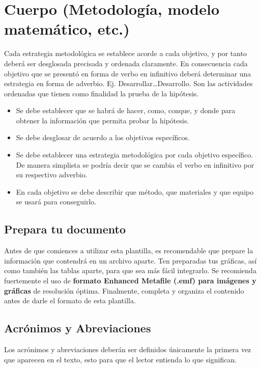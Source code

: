     \section{Cuerpo (Metodología, modelo matemático, etc.)}
    
    Cada estrategia metodológica se establece acorde a cada objetivo, y por tanto deberá ser desglosada precisada y ordenada claramente. En consecuencia cada objetivo que se presentó en forma de verbo en infinitivo deberá determinar una estrategia en forma de adverbio. Ej. Desarrollar…Desarrollo. Son las actividades ordenadas que tienen como finalidad la prueba de la hipótesis. 
    
    \begin{itemize}
        \item Se debe establecer que se habrá de hacer, como, conque, y donde para obtener la información que permita probar la hipótesis.  
        \item Se debe desglosar de acuerdo a los objetivos específicos. 
        \item Se debe establecer una estrategia metodológica por cada objetivo específico. De manera simplista se podría decir que se cambia el verbo en infinitivo por su respectivo adverbio.
        \item En cada objetivo se debe describir que método, que materiales y que equipo se usará para conseguirlo.
    \end{itemize}
    \subsection{Prepara tu documento}
    
    Antes de que comiences a utilizar esta plantilla, es recomendable que prepare la información que contendrá en un archivo aparte. 
    Ten preparadas tus gráficas, así como también las tablas aparte, para que sea más fácil integrarlo. 
    Se recomienda fuertemente el uso de \textbf{formato Enhanced Metafile (.emf) para imágenes y gráficas} de resolución óptima. 
    Finalmente, completa y organiza el contenido antes de darle el formato de esta plantilla. 
    
    \subsection{Acrónimos y Abreviaciones}
    
    Los acrónimos y abreviaciones deberán ser definidos únicamente la primera vez que aparecen en el texto, esto para que el lector entienda lo que significan.
    
